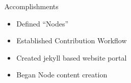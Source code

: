 \documentclass[final]{beamer}
\newlength{\sepwid}
\newlength{\onecolwid}
\newlength{\threecolwid}
\begin{document}
\begin{frame}[t]
\begin{columns}[t,totalwidth=\threecolwid]
\begin{column}{\sepwid}\end{column} %

\begin{column}{\onecolwid} %
	
\begin{alertblock}{Accomplishments}
	\begin{itemize}
		\item Defined ``Nodes''
		\item Established Contribution Workflow
		\item Created jekyll based website portal
		\item Began Node content creation
	\end{itemize} 
\end{alertblock}



\end{column}
\end{columns}
\end{frame}
\end{document}
